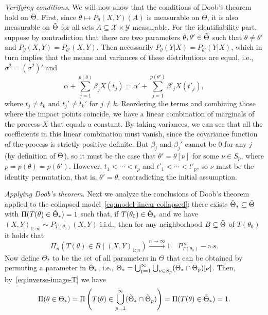 \textit{Verifying conditions}. We will now show that the conditions of Doob's theorem hold on \(\tilde{\Theta}\). First, since \(\theta \mapsto P_\theta(X, Y)(A)\) is measurable on \(\Theta\), it is also measurable on \(\tilde{\Theta}\) for all sets \(A\subseteq \mathcal X \times \mathcal Y\) measurable. For the identifiability part, suppose by contradiction that there are two parameters \(\theta,\theta' \in \tilde{\Theta}\) such that \(\theta\neq \theta'\) and \(P_{\theta}(X, Y) = P_{\theta'}(X, Y)\). Then necessarily \(P_{\theta}(Y|X) = P_{\theta'}(Y|X)\), which in turn implies that the means and variances of these distributions are equal, i.e., \(\sigma^2=(\sigma^2)'\) and
\[
  \alpha + \sum_{j=1}^{p(\theta)} \beta_j X(t_j) = \alpha' + \sum_{j=1}^{p(\theta')} \beta'_j X(t'_j),
\]
where \(t_j\neq t_k\) and \(t_j'\neq t_k'\) for \(j\neq k\). Reordering the terms and combining those where the impact points coincide, we have a linear combination of marginals of the process \(X\) that equals a constant. By taking variances, we can see that all the coefficients in this linear combination must vanish, since the covariance function of the process is strictly positive definite. But \(\beta_j\) and \(\beta_j'\) cannot be \(0\) for any \(j\) (by definition of \(\tilde{\Theta}\)), so it must be the case that \(\theta'=\theta[\nu]\) for some \(\nu \in S_p\), where \(p=p(\theta)=p(\theta')\). However, \(t_1< \cdots < t_p\) and \(t'_1 < \cdots < t'_p\), so  \(\nu\) must be the identity permutation, that is, \(\theta'=\theta\), contradicting the initial assumption.

\textit{Applying Doob's theorem}. Next we analyze the conclusions of Doob's theorem applied to the collapsed model~\eqref{eq:model-linear-collapsed}: there exists \(\tilde{\Theta}_* \subseteq \tilde{\Theta}\) with \(\Pi(T(\theta)\in\tilde{\Theta}_*)=1\) such that, if \(T(\theta_0)\in \tilde{\Theta}_*\) and we have \((X,Y)_{1:\infty} \sim P_{T(\theta_0)}(X, Y)\) i.i.d., then for any neighborhood \(B\subseteq \tilde{\Theta}\) of \(T(\theta_0)\) it holds that
\begin{equation}\label{eq:consistency-collapsed}
  \Pi_n(T(\theta) \in B \mid (X,Y)_{1:n}) \xrightarrow[]{n\to\infty} 1 \quad P_{T(\theta_0)}^\infty-\text{a.s.}
\end{equation}
Now define \(\Theta_*\) to be the set of all parameters in \(\Theta\) that can be obtained by permuting a parameter in \(\tilde{\Theta}_*\), i.e., \(\Theta_* = \bigcup_{p=1}^\infty \bigcup_{\nu\in S_p}(\tilde{\Theta}_* \cap \tilde{\Theta}_p)[\nu]\). Then, by~\eqref{eq:inverse-image-T} we have
\[
  \Pi(\theta\in \Theta_*) = \Pi\left(T(\theta) \in \bigcup_{p=1}^\infty (\tilde{\Theta}_*\cap \tilde{\Theta}_p)\right) = \Pi(T(\theta)\in \tilde{\Theta}_*) = 1.
\]

